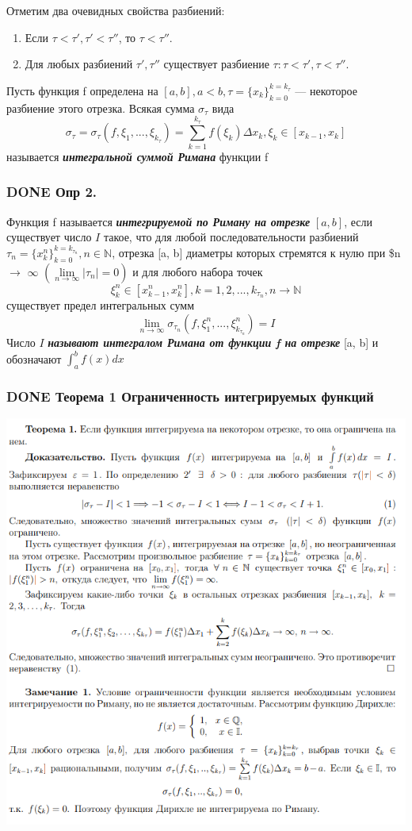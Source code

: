 \documentclass[11pt]{article}
\begin{document}
Отметим два очевидных свойства разбиений:
\begin{enumerate}
\item Если \(\tau<\tau',\tau'<\tau''\), то \(\tau<\tau''\).
\item Для любых разбиений \(\tau', \tau''\) существует разбиение \(\tau : \tau < \tau', \tau < \tau''\).
\end{enumerate}
Пусть функция f определена на \([a, b], a < b, \tau = \{x_k\}_{k=0}^{k=k_\tau}\) — некоторое разбиение
этого отрезка. Всякая сумма \(\sigma_\tau\) вида
$$
\sigma_\tau = \sigma_\tau(f,\xi_1,...,\xi_{k_\tau})=\sum_{k=1}^{k_\tau}f(\xi_{k})\Delta x_k, \xi_k\in[x_{k-1},x_k]
$$
называется \textbf{\emph{интегральной суммой Римана}} функции f

\subsubsection{{\bfseries\sffamily DONE} Опр 2.}
\label{sec:org077be24}
Функция f называется \textbf{\emph{интегрируемой по Риману на отрезке}}
 \([a, b]\), если существует число \(I\) такое, что для любой последовательности разбиений
 \(\tau_n = \{x_k^n\}_{k=0}^{k=k_{\tau_n}}, n\in \mathbb{N}\), отрезка [a, b] диаметры которых стремятся к нулю при \$n\(\to\) \(\infty\) \((\lim\limits_{n\to\infty}|\tau_n|=0)\) и для любого набора точек
$$
\xi_k^n\in[x_{k-1}^n, x_k^n], k=1,2,...,k_{\tau_n}, n\to\mathbb{N}
$$
 существует предел интегральных сумм
$$
\lim\limits_{n\to\infty}\sigma_{\tau_n}(f,\xi_1^n,...,\xi_{k_{\tau_n}}^n) = I
$$
 Число \(I\) \textbf{\emph{называют интегралом Римана от функции f на отрезке}} [a, b] и обозначают \(\int_a^bf(x)dx\)

\subsubsection{{\bfseries\sffamily DONE} Теорема 1 Ограниченность интегрируемых функций}
\label{sec:org3119640}
\begin{center}
\includegraphics[width=.9\linewidth]{img/b2-t1.png}
\end{center}
\end{document}
